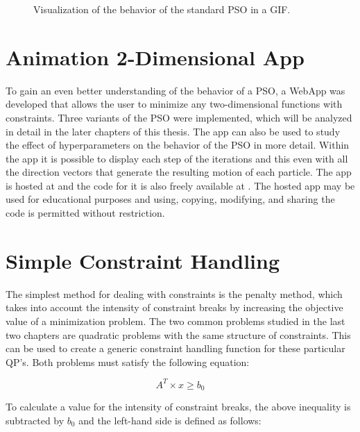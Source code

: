 \documentclass[
  oneside, a4paper, 12pt, openany]{book}
\theoremstyle{definition}
\theoremstyle{definition}
\theoremstyle{definition}
\theoremstyle{definition}
\theoremstyle{remark}
\begin{document}
\begin{center}
\begin{figure}[!h]
\caption{Visualization of the behavior of the standard PSO in a GIF.}
\end{figure}
\end{center}

\hypertarget{animation-2-dimensional-app}{%
\section{Animation 2-Dimensional App}\label{animation-2-dimensional-app}}

To gain an even better understanding of the behavior of a PSO, a WebApp was developed that allows the user to minimize any two-dimensional functions with constraints. Three variants of the PSO were implemented, which will be analyzed in detail in the later chapters of this thesis. The app can also be used to study the effect of hyperparameters on the behavior of the PSO in more detail. Within the app it is possible to display each step of the iterations and this even with all the direction vectors that generate the resulting motion of each particle. The app is hosted at \citep{PSOApp} and the code for it is also freely available at \citep{GitPSO}. The hosted app may be used for educational purposes and using, copying, modifying, and sharing the code is permitted without restriction.

\hypertarget{simple-constraint-handling}{%
\section{Simple Constraint Handling}\label{simple-constraint-handling}}

The simplest method for dealing with constraints is the penalty method, which takes into account the intensity of constraint breaks by increasing the objective value of a minimization problem. The two common problems studied in the last two chapters are quadratic problems with the same structure of constraints. This can be used to create a generic constraint handling function for these particular QP's. Both problems must satisfy the following equation:

\[
  A^T \times x  \geq b_0
\]

To calculate a value for the intensity of constraint breaks, the above inequality is subtracted by \(b_0\) and the left-hand side is defined as follows:
\end{document}
